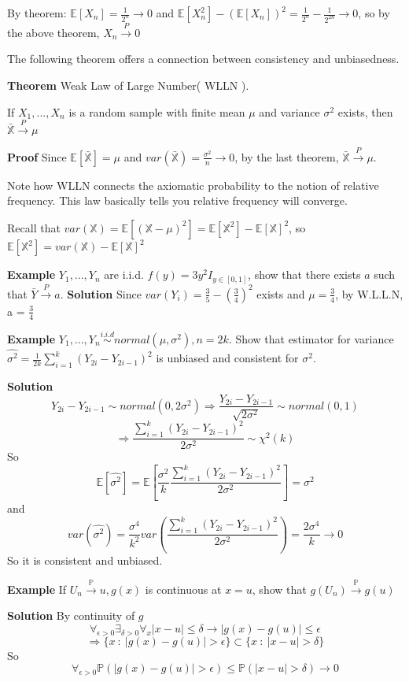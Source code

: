 \documentclass[a4paper,12pt]{article}
\begin{document}
By theorem: 
$\mathbb{E}[X_n] = \frac{1}{2^n} \to 0$ and $\mathbb{E}[X_n^2]-(\mathbb{E}[X_n])^2 = \frac{1}{2^n} - \frac{1}{2^{2n}} \to 0$, so by the above theorem, $X_n \overset{P}{\to} 0$ 

The following theorem offers a connection between consistency and unbiasedness. 

\textbf{Theorem} Weak Law of Large Number( WLLN ).

If $X_1, ..., X_n$ is a random sample with finite mean $\mu$ and variance $\sigma^2$ exists, then $\bar{\mathbb{X}} \overset{P}{\to} \mu$

\textbf{Proof} Since $\mathbb{E}[\bar{\mathbb{X}}] = \mu$ and $var(\bar{\mathbb{X}}) = \frac{\sigma^2}{n} \to 0$, by the last theorem, $\bar{\mathbb{X}} \overset{P}{\to} \mu$. 

Note how WLLN connects the axiomatic probability to the notion of relative frequency. This law basically tells you relative frequency will converge. 

Recall that $var(\mathbb{X}) = \mathbb{E}[(\mathbb{X}-\mu)^2] = \mathbb{E}[\mathbb{X}^2] - \mathbb{E}[\mathbb{X}]^2$, so $ \mathbb{E}[\mathbb{X}^2] = var(\mathbb{X}) - \mathbb{E}[\mathbb{X}]^2$ 

\textbf{Example} $Y_1, ..., Y_n$ are i.i.d. $f(y) = 3y^2 I_{y\in[0,1]}$, show that there exists $a$ such that $\bar{Y} \overset{P} {\to} a$. 
\textbf{Solution} Since $var(Y_i) = \frac{3}{5}-(\frac{3}{4})^2$ exists and $\mu = \frac{3}{4}$, by W.L.L.N, a = $\frac{3}{4}$ 

\textbf{Example} $Y_1, ..., Y_n \overset{i.i.d}{\sim} normal(\mu, \sigma^2), n=2k$. Show that estimator for variance $\hat{\sigma^2} = \frac{1}{2k}\sum_{i=1}^k(Y_{2i} - Y_{2i-1})^2$ is unbiased and consistent for $\sigma^2$. 

\textbf{Solution}
$$Y_{2i} - Y_{2i-1} \sim normal(0, 2\sigma^2) \Rightarrow \frac{Y_{2i} - Y_{2i-1}}{\sqrt{2\sigma^2}} \sim normal(0, 1)$$
$$\Rightarrow\frac{\sum_{i=1}^k(Y_{2i} - Y_{2i-1})^2}{2\sigma^2} \sim \chi^2(k)$$
So
$$\mathbb{E}[ \hat{\sigma^2} ] = \mathbb{E}[\frac{\sigma^2}{k} \frac{\sum_{i=1}^k(Y_{2i} - Y_{2i-1})^2}{2\sigma^2}] = \sigma^2$$
and
$$var(\hat{\sigma^2}) = \frac{\sigma^4}{k^2} var(  \frac{\sum_{i=1}^k(Y_{2i} - Y_{2i-1})^2}{2\sigma^2} ) = \frac{2\sigma^4}{k} \to 0$$
So it is consistent and unbiased. 

\textbf{Example} If $U_n \overset{\mathbb{P}}{\to} u, g(x)$ is continuous at $x=u$, show that $g(U_n) \overset{\mathbb{P}}{\to} g(u)$ 

\textbf{Solution} By continuity of $g$
$$\forall_{\epsilon > 0} \exists_{\delta>0} \forall_{x} |x-u|\leq\delta \to |g(x)-g(u)|\leq \epsilon$$
$$\Rightarrow \{ x\ : \ |g(x)-g(u)| > \epsilon \} \subset \{ x\ : \ |x-u|> \delta \}$$
So
$$\forall_{\epsilon > 0} \mathbb{P}( |g(x)-g(u)| > \epsilon ) \leq \mathbb{P}( |x-u|> \delta ) \to 0$$
\end{document}
